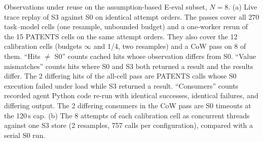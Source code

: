 \begin{table}[tbp]
  \caption{Observations under reuse on the assumption-based E-eval subset, $N=8$. (a) Live trace replay of S3 against
  S0 on identical attempt orders. The passes cover all 270 task--model cells (one resample, unbounded budget) and a
  one-worker rerun of the 15 PATENTS cells on the same attempt orders. They also cover the 12 calibration cells
  (budgets $\infty$ and 1/4, two resamples) and a CoW pass on 8 of them. ``Hits $\neq$ S0'' counts cached hits whose
  observation differs from S0. ``Value mismatches'' counts hits where S0 and S3 both returned a result and the
  results differ. The 2 differing hits of the all-cell pass are PATENTS calls whose S0 execution failed under load
  while S3 returned a result. ``Consumers'' counts recorded agent Python code re-run with identical successes,
  identical failures, and differing output. The 2 differing consumers in the CoW pass are S0 timeouts at the 120\,s
  cap. (b) The 8 attempts of each calibration cell as concurrent threads against one S3 store (2 resamples, 757 calls
  per configuration), compared with a serial S0 run.}
  \label{tab:e2e}
  \small
  \\[4pt]
\end{table}
